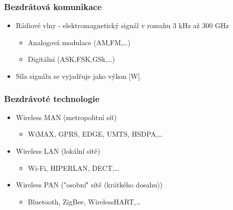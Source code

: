 \subsubsection*{Bezdrátová komunikace}
\begin{itemize}
  \item Rádiové vlny - elektromagnetický signál v rozsahu 3 kHz až 300 GHz \begin{itemize}
    \item Analogová modulace (AM,FM,\dots)
    \item Digitální (ASK,FSK,GSk,\dots)
  \end{itemize}
  \item Síla signálu se vyjadřuje jako výkon [W].
\end{itemize}

\subsubsection*{Bezdrávoté technologie}
\begin{itemize}
  \item Wireless MAN (metropolitní síť) \begin{itemize}
    \item WiMAX, GPRS, EDGE, UMTS, HSDPA,\dots
  \end{itemize}
  \item Wireless LAN (lokální sítě) \begin{itemize}
    \item Wi-Fi, HIPERLAN, DECT,\dots
  \end{itemize}
  \item Wireless PAN ("osobní" sítě (krátkého dosahu)) \begin{itemize}
    \item Bluetooth, ZigBee, WirelessHART,\dots
  \end{itemize}
\end{itemize}